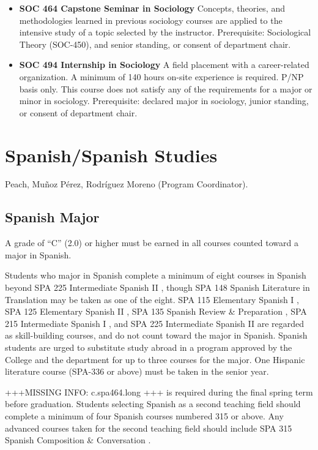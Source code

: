 \documentclass[
  letterpaper,
]{scrbook}
\begin{document}
\begin{itemize}
\item
  \textbf{SOC 464 Capstone Seminar in Sociology} Concepts, theories, and
  methodologies learned in previous sociology courses are applied to the
  intensive study of a topic selected by the instructor. Prerequisite:
  Sociological Theory (SOC-450), and senior standing, or consent of
  department chair.
\item
  \textbf{SOC 494 Internship in Sociology} A field placement with a
  career-related organization. A minimum of 140 hours on-site experience
  is required. P/NP basis only. This course does not satisfy any of the
  requirements for a major or minor in sociology. Prerequisite: declared
  major in sociology, junior standing, or consent of department chair.
\end{itemize}

\hypertarget{spanishspanish-studies}{%
\section{Spanish/Spanish Studies}\label{spanishspanish-studies}}

Peach, Muñoz Pérez, Rodríguez Moreno (Program Coordinator).

\hypertarget{spanish-major}{%
\subsection{Spanish Major}\label{spanish-major}}

A grade of ``C'' (2.0) or higher must be earned in all courses counted
toward a major in Spanish.

Students who major in Spanish complete a minimum of eight courses in
Spanish beyond SPA 225 Intermediate Spanish II , though SPA 148 Spanish
Literature in Translation may be taken as one of the eight. SPA 115
Elementary Spanish I , SPA 125 Elementary Spanish II , SPA 135 Spanish
Review \& Preparation , SPA 215 Intermediate Spanish I , and SPA 225
Intermediate Spanish II are regarded as skill-building courses, and do
not count toward the major in Spanish. Spanish students are urged to
substitute study abroad in a program approved by the College and the
department for up to three courses for the major. One Hispanic
literature course (SPA-336 or above) must be taken in the senior year.

+++MISSING INFO: c.spa464.long +++ is required during the final spring
term before graduation. Students selecting Spanish as a second teaching
field should complete a minimum of four Spanish courses numbered 315 or
above. Any advanced courses taken for the second teaching field should
include SPA 315 Spanish Composition \& Conversation .
\end{document}
